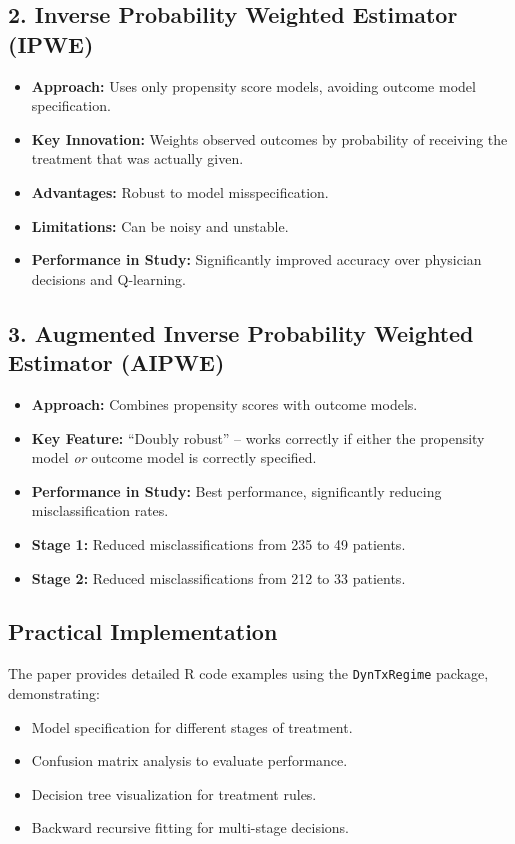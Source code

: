 \subsection*{2. Inverse Probability Weighted Estimator (IPWE)}
\begin{itemize}
    \item \textbf{Approach:} Uses only propensity score models, avoiding outcome model specification.
    \item \textbf{Key Innovation:} Weights observed outcomes by probability of receiving the treatment that was actually given.
    \item \textbf{Advantages:} Robust to model misspecification.
    \item \textbf{Limitations:} Can be noisy and unstable.
    \item \textbf{Performance in Study:} Significantly improved accuracy over physician decisions and Q-learning.
\end{itemize}

\subsection*{3. Augmented Inverse Probability Weighted Estimator (AIPWE)}
\begin{itemize}
    \item \textbf{Approach:} Combines propensity scores with outcome models.
    \item \textbf{Key Feature:} ``Doubly robust'' -- works correctly if either the propensity model \textit{or} outcome model is correctly specified.
    \item \textbf{Performance in Study:} Best performance, significantly reducing misclassification rates.
\end{itemize}

\begin{itemize}
    \item \textbf{Stage 1:} Reduced misclassifications from 235 to 49 patients.
    \item \textbf{Stage 2:} Reduced misclassifications from 212 to 33 patients.
\end{itemize}

\subsection*{Practical Implementation}
The paper provides detailed R code examples using the \texttt{DynTxRegime} package, demonstrating:
\begin{itemize}
    \item Model specification for different stages of treatment.
    \item Confusion matrix analysis to evaluate performance.
    \item Decision tree visualization for treatment rules.
    \item Backward recursive fitting for multi-stage decisions.
\end{itemize}

